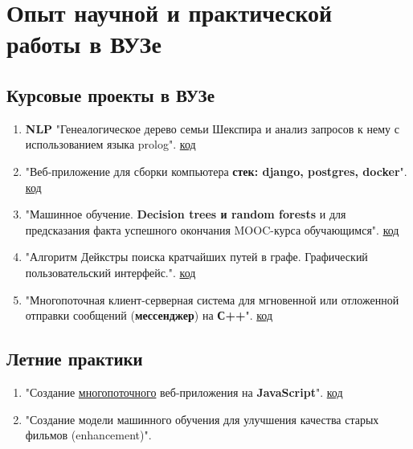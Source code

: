 \documentclass[a4paper,12pt]{article}
\begin{document}
\section{Опыт научной и практической работы в ВУЗе}

\subsection{Курсовые проекты в ВУЗе}
\begin{enumerate}
    \item \textbf{NLP} "Генеалогическое дерево семьи Шекспира и анализ запросов к нему с использованием языка prolog". \href{https://github.com/Suraba03/LP/tree/main/cp}{код}
    
    \item "Веб-приложение для сборки компьютера \textbf{стек: django, postgres, docker}". \href{https://github.com/Leha-Slava-Max-Kirill/computer_workshop}{код}
    
    \item "Машинное обучение. \textbf{Decision trees и random forests} и  для предсказания факта успешного окончания MOOC-курса обучающимся". \href{https://github.com/Suraba03/mini_ML_project_sem1}{код}
    
    \item "Алгоритм Дейкстры поиска кратчайших путей в графе. Графический пользовательский интерфейс.". \href{https://github.com/Suraba03/mai_prooga_sem2/tree/main/cp_dm_Dijkstra}{код}
    
    \item "Многопоточная клиент-серверная система для мгновенной или отложенной отправки сообщений (\textbf{мессенджер}) на \textbf{С++}". \href{https://github.com/Suraba03/OS_MAI/tree/main/cp}{код}

\end{enumerate}
\subsection{Летние практики}

\begin{enumerate}
    \item "Создание \underline{многопоточного} веб-приложения на \textbf{JavaScript}". \href{https://github.com/Leha-Slava-Max-Kirill/application}{код}
    \item "Создание модели машинного обучения для улучшения качества старых фильмов (enhancement)".
\end{enumerate}
\end{document}
